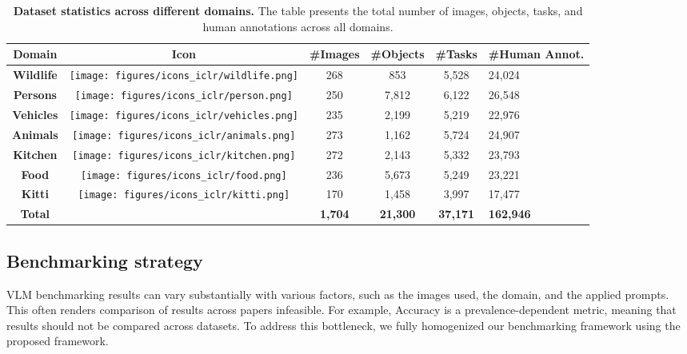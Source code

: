 \begin{table}[t]
\centering
\setlength{\tabcolsep}{4pt}  %
\footnotesize
\begin{tabular}{|c|c|c|c|c|p{1.3cm}|}
\hline
\textbf{Domain} & \textbf{Icon} & \textbf{\#Images} & \textbf{\#Objects} & \textbf{\#Tasks} & \textbf{\#Human Annot.} \\
\hline
\textbf{Wildlife} & \texttt{[image: figures/icons\_iclr/wildlife.png]} & 268 & 853 & 5,528 & 24,024 \\
\textbf{Persons} & \texttt{[image: figures/icons\_iclr/person.png]} & 250 & 7,812 & 6,122 & 26,548 \\
\textbf{Vehicles} & \texttt{[image: figures/icons\_iclr/vehicles.png]} & 235 & 2,199 & 5,219 & 22,976 \\
\textbf{Animals} & \texttt{[image: figures/icons\_iclr/animals.png]} & 273 & 1,162 & 5,724 & 24,907 \\
\textbf{Kitchen} & \texttt{[image: figures/icons\_iclr/kitchen.png]} & 272 & 2,143 & 5,332 & 23,793 \\
\textbf{Food} & \texttt{[image: figures/icons\_iclr/food.png]} & 236 & 5,673 & 5,249 & 23,221 \\
\textbf{Kitti} & \texttt{[image: figures/icons\_iclr/kitti.png]} & 170 & 1,458 & 3,997 & 17,477 \\
\hline
\textbf{Total} & & \textbf{1,704} & \textbf{21,300} & \textbf{37,171} & \textbf{162,946} \\
\hline
\end{tabular}
\caption{\textbf{Dataset statistics across different domains.} The table presents the total number of images, objects, tasks, and human annotations across all domains.}
\label{tab:dataset_statistics}
\end{table}



\subsection{Benchmarking strategy}
VLM benchmarking results can vary substantially with various factors, such as the images used, the domain, and the applied prompts. This often renders comparison of results across papers infeasible. For example, Accuracy is a prevalence-dependent metric, meaning that results should not be compared across datasets. To address this bottleneck, we fully homogenized our benchmarking framework using the proposed framework.

